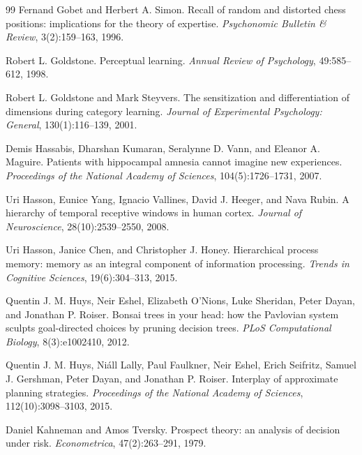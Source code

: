 \documentclass[11pt,a4paper]{article}
\theoremstyle{remark}
\begin{document}
\begin{thebibliography}{99}
Fernand Gobet and Herbert A. Simon.
\newblock Recall of random and distorted chess positions: implications for the theory of expertise.
\newblock \emph{Psychonomic Bulletin \& Review}, 3(2):159--163, 1996.

Robert L. Goldstone.
\newblock Perceptual learning.
\newblock \emph{Annual Review of Psychology}, 49:585--612, 1998.

Robert L. Goldstone and Mark Steyvers.
\newblock The sensitization and differentiation of dimensions during category learning.
\newblock \emph{Journal of Experimental Psychology: General}, 130(1):116--139, 2001.

Demis Hassabis, Dharshan Kumaran, Seralynne D. Vann, and Eleanor A. Maguire.
\newblock Patients with hippocampal amnesia cannot imagine new experiences.
\newblock \emph{Proceedings of the National Academy of Sciences}, 104(5):1726--1731, 2007.

Uri Hasson, Eunice Yang, Ignacio Vallines, David J. Heeger, and Nava Rubin.
\newblock A hierarchy of temporal receptive windows in human cortex.
\newblock \emph{Journal of Neuroscience}, 28(10):2539--2550, 2008.

Uri Hasson, Janice Chen, and Christopher J. Honey.
\newblock Hierarchical process memory: memory as an integral component of information processing.
\newblock \emph{Trends in Cognitive Sciences}, 19(6):304--313, 2015.

Quentin J. M. Huys, Neir Eshel, Elizabeth O'Nions, Luke Sheridan, Peter Dayan, and Jonathan P. Roiser.
\newblock Bonsai trees in your head: how the Pavlovian system sculpts goal-directed choices by pruning decision trees.
\newblock \emph{PLoS Computational Biology}, 8(3):e1002410, 2012.

Quentin J. M. Huys, Ni\'all Lally, Paul Faulkner, Neir Eshel, Erich Seifritz, Samuel J. Gershman, Peter Dayan, and Jonathan P. Roiser.
\newblock Interplay of approximate planning strategies.
\newblock \emph{Proceedings of the National Academy of Sciences}, 112(10):3098--3103, 2015.

Daniel Kahneman and Amos Tversky.
\newblock Prospect theory: an analysis of decision under risk.
\newblock \emph{Econometrica}, 47(2):263--291, 1979.


\end{thebibliography}
\end{document}
